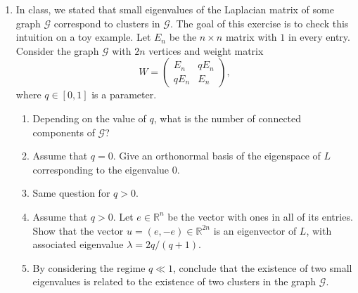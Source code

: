 \documentclass[12pt]{article}
\newcommand{\R}{\mathbb{R}}
\newcommand{\GG}{\mathcal{G}}
\newcommand{\rvline}{\hspace*{-\arraycolsep}\vline\hspace*{-\arraycolsep}}
\begin{document}
\begin{enumerate}
\item In class, we stated that small eigenvalues of the Laplacian matrix of some graph $\GG$ correspond to clusters in $\GG$. The goal of this exercise is to check this intuition on a toy example. Let $E_n$ be the $n\times n$ matrix with $1$ in every entry. Consider the graph $\GG$ with $2n$ vertices and weight matrix
\[ W = \begin{pmatrix}
E_n & qE_n\\
qE_n & E_n
\end{pmatrix},\]
where $q\in [0,1]$ is a parameter.
\begin{enumerate}
\item Depending on the value of $q$, what is the number of connected components of $\GG$?
\item Assume that $q=0$. Give an orthonormal basis of the eigenspace of $L$ corresponding to the eigenvalue $0$.
\item Same question for $q>0$. %
\item Assume that $q>0$. Let $e\in \R^n$ be the vector with ones in all of its entries. Show that the vector $u=(e,-e)\in \R^{2n}$ is an eigenvector of $L$, with associated eigenvalue $\lambda=2q/(q+1)$. 
\item By considering the regime $q\ll 1$, conclude that the existence of two small eigenvalues is related to the existence of two clusters in the graph $\GG$.
\end{enumerate}
%

\end{enumerate}
\end{document}
